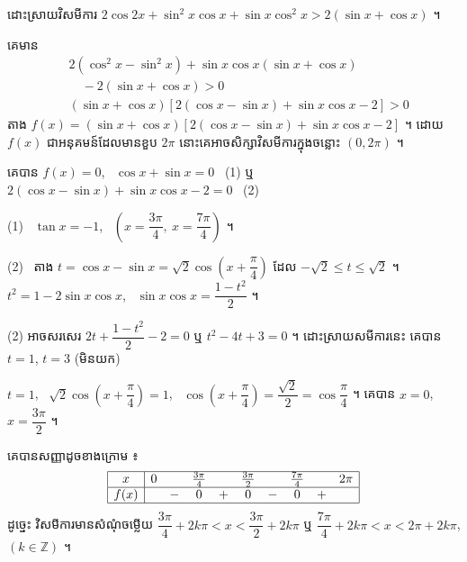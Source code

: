 \begin{example}[លំហាត់គំរូ ៦]
ដោះស្រាយវិសមីការ $2\cos 2x + \sin^2 x\cos x + \sin x\cos^2 x > 2(\sin x + \cos x)$ ។
\end{example}
\ans
គេមាន
\[
\begin{aligned}
&2(\cos^2 x - \sin^2 x) + \sin x\cos x(\sin x + \cos x)\\
&\quad - 2(\sin x + \cos x) > 0\\
&(\sin x + \cos x)[2(\cos x - \sin x) + \sin x\cos x - 2] > 0
\end{aligned}
\]
តាង $f(x) = (\sin x + \cos x)[2(\cos x - \sin x) + \sin x\cos x - 2]$ ។ ដោយ $f(x)$ ជាអនុគមន៍ដែលមានខួប $2\pi$ នោះគេអាចសិក្សាវិសមីការក្នុងចន្លោះ $(0, 2\pi)$ ។

គេបាន $f(x) = 0$, \ $\cos x + \sin x = 0$ \ (1) ឬ $2(\cos x - \sin x) + \sin x\cos x - 2 = 0$ \ (2)

(1) \ $\tan x = -1$, \ $\left(x = \dfrac{3\pi}{4}, \ x = \dfrac{7\pi}{4}\right)$ ។

(2) \ តាង $t = \cos x - \sin x = \sqrt{2}\cos\left(x + \dfrac{\pi}{4}\right)$ ដែល $-\sqrt{2} \le t \le \sqrt{2}$ ។ $t^2 = 1 - 2\sin x\cos x$, \ $\sin x\cos x = \dfrac{1 - t^2}{2}$ ។

(2) អាចសរសេរ $2t + \dfrac{1 - t^2}{2} - 2 = 0$ ឬ $t^2 - 4t + 3 = 0$ ។ ដោះស្រាយសមីការនេះ គេបាន $t = 1$, $t = 3$ (មិនយក)

$t = 1$, \ $\sqrt{2}\cos\left(x + \dfrac{\pi}{4}\right) = 1$, \ $\cos\left(x + \dfrac{\pi}{4}\right) = \dfrac{\sqrt{2}}{2} = \cos\dfrac{\pi}{4}$ ។ គេបាន $x = 0$, $x = \dfrac{3\pi}{2}$ ។

គេបានសញ្ញាដូចខាងក្រោម ៖
\[
\begin{array}{|c|ccccccccc|}\hline
x & 0 & & \frac{3\pi}{4} & & \frac{3\pi}{2} & & \frac{7\pi}{4} & & 2\pi\\ \hline
f(x) & & - & 0 & + & 0 & - & 0 & + & \\ \hline
\end{array}
\]
ដូច្នេះ វិសមីការមានសំណុំចម្លើយ $\dfrac{3\pi}{4} + 2k\pi < x < \dfrac{3\pi}{2} + 2k\pi$ ឬ $\dfrac{7\pi}{4} + 2k\pi < x < 2\pi + 2k\pi$, $(k \in \mathbb{Z})$ ។

